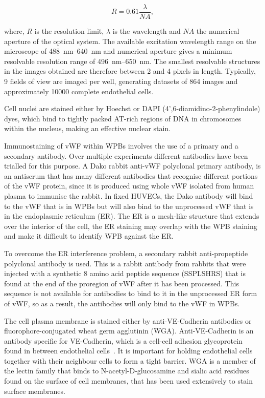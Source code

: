 \begin{equation}
R=0.61\frac{\lambda}{NA},
\end{equation}

where, $R$ is the resolution limit, $\lambda$ is the wavelength and $NA$ the numerical aperture of the optical system. The available excitation wavelength range on the microscope of \SIrange{488}{640}{\nano\meter} and numerical aperture gives a minimum resolvable resolution range of \SIrange{496}{650}{\nano\meter}. The smallest resolvable structures in the images obtained are therefore between 2 and 4 pixels in length. Typically, 9 fields of view are imaged per well, generating datasets of 864 images and approximately 10000 complete endothelial cells.

Cell nuclei are stained either by Hoechst or DAPI (4',6-diamidino-2-phenylindole) dyes, which bind to tightly packed AT-rich regions of DNA in chromosomes within the nucleus, making an effective nuclear stain.

Immunostaining of vWF within WPBs involves the use of a primary and a secondary antibody. Over multiple experiments different antibodies have been trialled for this purpose. A Dako rabbit anti-vWF polyclonal primary antibody, is an antiserum that has many different antibodies that recognise different portions of the vWF protein, since it is produced using whole vWF isolated from human plasma to immunise the rabbit. In fixed HUVECs, the Dako antibody will bind to the vWF that is in WPBs but will also bind to the unprocessed vWF that is in the endoplasmic reticulum (ER). The ER is a mesh-like structure that extends over the interior of the cell, the ER staining may overlap with the WPB staining and make it difficult to identify WPB against the ER.

To overcome the ER interference problem, a secondary rabbit anti-propeptide polyclonal antibody is used. This is a rabbit antibody from rabbits that were injected with a synthetic 8 amino acid peptide sequence (SSPLSHRS) that is found at the end of the proregion of vWF after it has been processed. This sequence is not available for antibodies to bind to it in the unprocessed ER form of vWF, so as a result, the antibodies will only bind to the vWF in WPBs.

The cell plasma membrane is stained either by anti-VE-Cadherin antibodies or fluorophore-conjugated wheat germ agglutinin (WGA). Anti-VE-Cadherin is an antibody specific for VE-Cadherin, which is a cell-cell adhesion glycoprotein found in between endothelial cells~\cite{Vestweber2008}. It is important for holding endothelial cells together with their neighbour cells to form a tight barrier. WGA is a member of the lectin family that binds to N-acetyl-D-glucosamine and sialic acid residues found on the surface of cell membranes, that has been used extensively to stain surface membranes.

